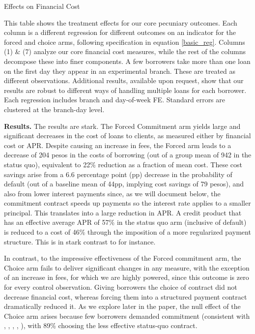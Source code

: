 \documentclass[11pt, a4paper]{article}
\begin{document}
\begin{table}
\caption{Effects on Financial Cost}
\label{main_impact_table}
\begin{center}
\resizebox{1.0\textwidth}{!}{
\scriptsize{}
}
\end{center}
\scriptsize{This table shows the treatment effects for our core pecuniary outcomes. Each column is a different regression for different outcomes on an indicator for the forced and choice arms, following specification in equation \ref{basic_reg}. Columns (1) \& (7) analyze our core financial cost measures, while the rest of the columns decompose these into finer components.
A few borrowers take more than one loan on the first day they appear in an experimental branch. These are treated as different observations. Additional results, available upon request, show that our results are robust to different ways of handling multiple loans for each borrower. Each regression includes branch and day-of-week FE. Standard errors are clustered at the branch-day level. }

\end{table}



\vspace{.2in}
\noindent \textbf{Results.} The results are stark. The Forced Commitment arm yields large and significant decreases in the cost of loans to clients, as measured either by financial cost or APR. Despite causing an increase in fees, the Forced arm leads to a decrease of 204 pesos in the costs of borrowing (out of a group mean of 942 in the status quo), equivalent to 22\% reduction as a fraction of mean cost. These cost savings arise from a 6.6 percentage point (pp) decrease in the probability of default (out of a baseline mean of 44pp,  implying cost savings of 79 pesos), and also from lower interest payments since, as we will document below, the commitment contract speeds up payments so the interest rate applies to a smaller principal. This translates into a large reduction in APR. A credit product that has an effective average APR of 57\% in the status quo arm (inclusive of default) is reduced to a cost of 46\% through the imposition of a more regularized payment structure. This is in stark contrast to \cite{Pande} for instance.  

In contrast, to the impressive effectiveness of the Forced commitment arm, the Choice arm fails to deliver significant changes in any measure, with the exception of an increase in fees, for which we are highly powered, since this outcome is zero for every control observation. Giving borrowers the choice of contract did not decrease financial cost, whereas forcing them into a structured payment contract dramatically reduced it. As we explore later in the paper, the null effect of the Choice arm arises because few borrowers demanded commitment (consistent with \cite{Ashraf}, \cite{Gine}, \cite{Ted}, \cite{Royer}, \cite{Sprenger}), with 89\% choosing the less effective status-quo contract.
\end{document}
